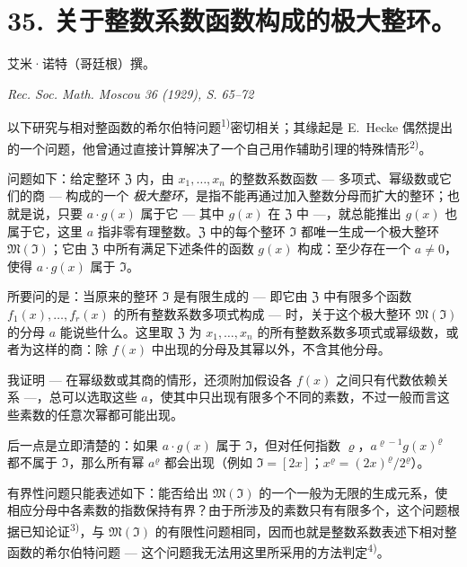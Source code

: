 \section*{35. 关于整数系数函数构成的极大整环。}

\begin{center}
艾米·诺特（哥廷根）撰。\par
\emph{Rec. Soc. Math. Moscou 36 (1929), S. 65--72}
\end{center}




以下研究与相对整函数的希尔伯特问题\textsuperscript{1)}密切相关；其缘起是 E.\ Hecke 偶然提出的一个问题，他曾通过直接计算解决了一个自己用作辅助引理的特殊情形\textsuperscript{2)}。

问题如下：给定整环 $\mathfrak{Z}$ 内，由 $x_1,\ldots,x_n$ 的整数系数函数 --- 多项式、幂级数或它们的商 --- 构成的一个 \textit{极大整环}，是指不能再通过加入整数分母而扩大的整环；也就是说，只要 $a \cdot g(x)$ 属于它 --- 其中 $g(x)$ 在 $\mathfrak{Z}$ 中 ---，就总能推出 $g(x)$ 也属于它，这里 $a$ 指非零有理整数。$\mathfrak{Z}$ 中的每个整环 $\mathfrak{I}$ 都唯一生成一个极大整环 $\mathfrak{M}(\mathfrak{I})$；它由 $\mathfrak{Z}$ 中所有满足下述条件的函数 $g(x)$ 构成：至少存在一个 $a \neq 0$，使得 $a \cdot g(x)$ 属于 $\mathfrak{I}$。

所要问的是：当原来的整环 $\mathfrak{I}$ 是有限生成的 --- 即它由 $\mathfrak{Z}$ 中有限多个函数 $f_1(x),\ldots,f_r(x)$ 的所有整数系数多项式构成 --- 时，关于这个极大整环 $\mathfrak{M}(\mathfrak{I})$ 的分母 $a$ 能说些什么。这里取 $\mathfrak{Z}$ 为 $x_1,\ldots,x_n$ 的所有整数系数多项式或幂级数，或者为这样的商：除 $f(x)$ 中出现的分母及其幂以外，不含其他分母。

我证明 --- 在幂级数或其商的情形，还须附加假设各 $f(x)$ 之间只有代数依赖关系 ---，总可以选取这些 $a$，使其中只出现有限多个不同的素数，不过一般而言这些素数的任意次幂都可能出现。

后一点是立即清楚的：如果 $a\cdot g(x)$ 属于 $\mathfrak{I}$，但对任何指数 $\varrho$，$a^{\varrho-1}g(x)^{\varrho}$ 都不属于 $\mathfrak{I}$，那么所有幂 $a^{\varrho}$ 都会出现（例如 $\mathfrak{I}=[2x]$；$x^{\varrho}=(2x)^{\varrho}/2^{\varrho}$）。

有界性问题只能表述如下：能否给出 $\mathfrak{M}(\mathfrak{I})$ 的一个一般为无限的生成元系，使相应分母中各素数的指数保持有界？由于所涉及的素数只有有限多个，这个问题根据已知论证\textsuperscript{3)}，与 $\mathfrak{M}(\mathfrak{I})$ 的有限性问题相同，因而也就是整数系数表述下相对整函数的希尔伯特问题 --- 这个问题我无法用这里所采用的方法判定\textsuperscript{4)}。

